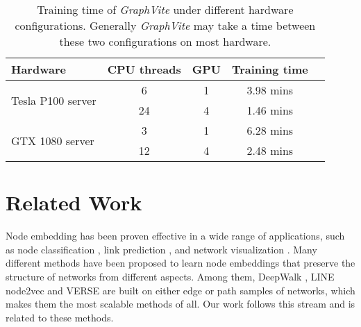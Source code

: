 \documentclass[sigconf]{acmart}
\newcommand{\Graphy}{\textit{GraphVite}\xspace}
\begin{document}
\begin{table}[!h]
    \centering
    \begin{tabular}{lcccc}
        \toprule
        Hardware                            & CPU threads   & GPU   & Training time \\
        \midrule
        \multirow{2}{*}{Tesla P100 server}  & 6             & 1     & 3.98 mins     \\
                                            & 24            & 4     & 1.46 mins     \\
        \midrule
        \multirow{2}{*}{GTX 1080 server}    & 3             & 1     & 6.28 mins     \\
                                            & 12            & 4     & 2.48 mins     \\
        \bottomrule
    \end{tabular}
    \caption{Training time of \Graphy under different hardware configurations. Generally \Graphy may take a time between these two configurations on most hardware.}
    \label{tab:hardware}
\end{table} \section{Related Work}
\label{sec:related}

Node embedding has been proven effective in a wide range of applications, such as node classification \cite{hamilton2017representation}, link prediction \cite{liben2007link}, and network visualization \cite{tang2016visualizing}. Many different methods \cite{perozzi2014deepwalk, tang2015line, cao2015grarep, grover2016node2vec, wang2016structural, qiu2018network, tsitsulin2018verse, velivckovic2018deep} have been proposed to learn node embeddings that preserve the structure of networks from different aspects. Among them, DeepWalk \cite{perozzi2014deepwalk}, LINE \cite{tang2015line} node2vec \cite{grover2016node2vec} and VERSE \cite{tsitsulin2018verse} are built on either edge or path samples of networks, which makes them the most scalable methods of all. Our work follows this stream and is related to these methods.
\end{document}
